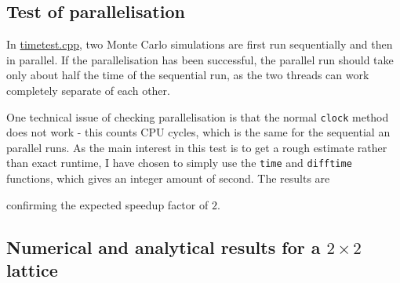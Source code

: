 \documentclass[12pt,english,a4paper]{article}
\newcommand{\program}[1]{\href{https://github.com/anjohan/Offentlig/blob/master/FYS3150/Oblig4/#1}{#1}}
\begin{document}
\subsection{Test of parallelisation}
In \program{timetest.cpp}, two Monte Carlo simulations are first run sequentially and then in parallel. If the parallelisation has been successful, the parallel run should take only about half the time of the sequential run, as the two threads can work completely separate of each other.

One technical issue of checking parallelisation is that the normal \texttt{clock} method does not work - this counts CPU cycles, which is the same for the sequential an parallel runs. As the main interest in this test is to get a rough estimate rather than exact runtime, I have chosen to simply use the \texttt{time} and \texttt{difftime} functions, which gives an integer amount of second. The results are

confirming the expected speedup factor of \(2\).

\subsection{Numerical and analytical results for a \(2\times2\) lattice}

\end{document}
